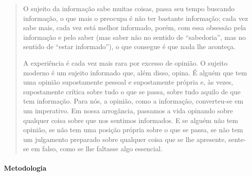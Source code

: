\documentclass[12pt]{extarticle}
\begin{document}
\begin{quote}
O sujeito da informação sabe
muitas coisas, passa seu tempo buscando informação,
o que mais o preocupa é não ter bastante informação;
cada vez sabe mais, cada vez está melhor informado,
porém, com essa obsessão pela informação e pelo saber (mas saber não no sentido 
de “sabedoria”, mas no
sentido de “estar informado”), o que consegue é que
nada lhe aconteça.

A experiência é cada vez mais
rara por excesso de opinião. O sujeito moderno é um
sujeito informado que, além disso, opina. É alguém
que tem uma opinião supostamente pessoal e supostamente própria e, às vezes, 
supostamente crítica sobre tudo o que se passa, sobre tudo aquilo de que tem
informação. Para nós, a opinião, como a informação,
converteu-se em um imperativo. Em nossa arrogância, passamos a vida opinando sobre qualquer coisa
sobre que nos sentimos informados. E se alguém não
tem opinião, se não tem uma posição própria sobre o
que se passa, se não tem um julgamento preparado
sobre qualquer coisa que se lhe apresente, sente-se em
falso, como se lhe faltasse algo essencial.
\end{quote}

\paragraph{Metodologia}
\end{document}
